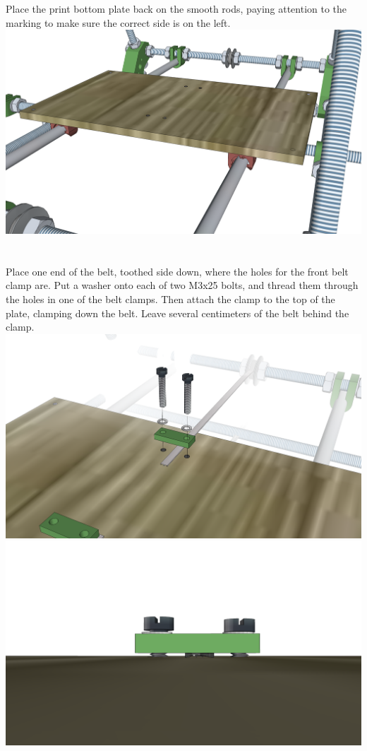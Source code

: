\documentclass[twoside,a4paper,titlepage]{memoir}
\begin{document}
	\section{}
	Place the print bottom plate back on the smooth rods, paying attention to the marking to make sure the
	correct side is on the left.\\
	\includegraphics[width=1\linewidth]{graphics/ch6_23.png}
	
	\section{}
	Place one end of the belt, toothed side down, where the holes for the front belt clamp are. Put a washer
	onto each of two M3x25 bolts, and thread them through the holes in one of the belt clamps. Then attach
	the clamp to the top of the plate, clamping down the belt. Leave several centimeters of the belt behind
	the clamp.\\
	\includegraphics[width=1\linewidth]{graphics/ch6_24_1.png}
	\includegraphics[width=1\linewidth]{graphics/ch6_24_2.png}
	
\end{document}
